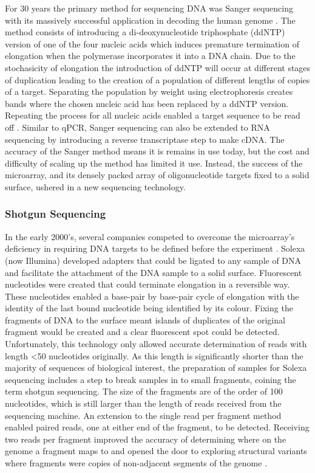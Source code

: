 \documentclass[../main.tex]{subfiles}
\begin{document}
For 30 years the primary method for sequencing DNA was Sanger sequencing with its massively successful application in decoding the human genome \parencite{Lander2001}. 
The method consists of introducing a di-deoxynucleotide triphosphate (ddNTP) version of one of the four nucleic acids which induces premature termination of elongation when the polymerase incorporates it into a DNA chain.
Due to the stochasicity of elongation the introduction of ddNTP will occur at different stages of duplication leading to the creation of a population of different lengths of copies of a target.
Separating the population by weight using electrophoresis creates bands where the chosen nucleic acid has been replaced by a ddNTP version.
Repeating the process for all nucleic acids enabled a target sequence to be read off \parencite{Sanger1977}.
Similar to qPCR, Sanger sequencing can also be extended to RNA sequencing by introducing a reverse transcriptase step to make cDNA.
The accuracy of the Sanger method means it is remains in use today, but the cost and difficulty of scaling up the method has limited it use.
Instead, the success of the microarray, and its densely packed array of oligonucleotide targets fixed to a solid surface, ushered in a new sequencing technology.

\subsubsection{Shotgun Sequencing}

In the early 2000's, several companies competed to overcome the microarray's deficiency in requiring DNA targets to be defined before the experiment \parencite{Rusk2007}.
Solexa (now Illumina) developed adapters that could be ligated to any sample of DNA and facilitate the attachment of the DNA sample to a solid surface. 
Fluorescent nucleotides were created that could terminate elongation in a reversible way.
These nucleotides enabled a base-pair by base-pair cycle of elongation with the identity of the last bound nucleotide being identified by its colour.
Fixing the fragments of DNA to the surface meant islands of duplicates of the original fragment would be created and a clear fluorescent spot could be detected.
Unfortunately, this technology only allowed accurate determination of reads with length <50 nucleotides originally.
As this length is significantly shorter than the majority of sequences of biological interest, the preparation of samples for Solexa sequencing includes a step to break samples in to small fragments, coining the term shotgun sequencing.
The size of the fragments are of the order of 100 nucleotides, which is still larger than the length of reads received from the sequencing machine.
An extension to the single read per fragment method enabled paired reads, one at either end of the fragment, to be detected.
Receiving two reads per fragment improved the accuracy of determining where on the genome a fragment maps to and opened the door to exploring structural variants where fragments were copies of non-adjacent segments of the genome \parencite{Risca2015}.
\end{document}
